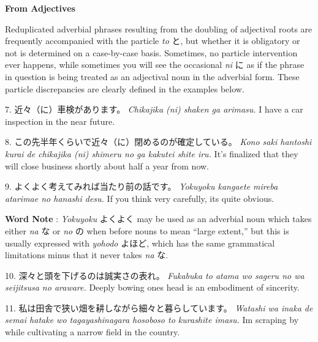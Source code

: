 \begin{center}
\textbf{From Adjectives }
\end{center}

\par{ Reduplicated adverbial phrases resulting from the doubling of adjectival roots are frequently accompanied with the particle \emph{to }と, but whether it is obligatory or not is determined on a case-by-case basis. Sometimes, no particle intervention ever happens, while sometimes you will see the occasional \emph{ni }に as if the phrase in question is being treated as an adjectival noun in the adverbial form. These particle discrepancies are clearly defined in the examples below. }

\par{7. 近々（に）車検があります。 \hfill\break
 \emph{Chikajika (ni) shaken ga arimasu. }\hfill\break
I have a car inspection in the near future. }

\par{8. この先半年くらいで近々（に）閉めるのが確定している。 \hfill\break
 \emph{Kono saki hantoshi kurai de chikajika (ni) shimeru no ga kakutei shite iru. }\hfill\break
It's finalized that they will close business shortly about half a year from now. }

\par{9. よくよく考えてみれば当たり前の話です。 \hfill\break
 \emph{Yokuyoku kangaete mireba atarimae no hanashi desu. }\hfill\break
If you think very carefully, it\textquotesingle s quite obvious. }

\par{\textbf{Word Note }: \emph{Yokuyoku }よくよく may be used as an adverbial noun which takes either \emph{na }な or \emph{no }の when before nouns to mean “large extent,” but this is usually expressed with \emph{yohodo }よほど, which has the same grammatical limitations minus that it never takes \emph{na }な. }

\par{10. 深々と頭を下げるのは誠実さの表れ。 \hfill\break
 \emph{Fukabuka to atama wo sageru no wa seijitsusa no araware. }\hfill\break
Deeply bowing one\textquotesingle s head is an embodiment of sincerity. }

\par{11. 私は田舎で狭い畑を耕しながら細々と暮らしています。 \hfill\break
 \emph{Watashi wa inaka de semai hatake wo tagayashinagara hosoboso to kurashite imasu. }\hfill\break
I\textquotesingle m scraping by while cultivating a narrow field in the country. }

